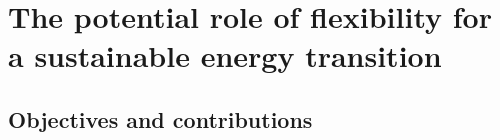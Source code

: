 \chapter{The potential role of flexibility for a sustainable energy transition}
\label{The potential role of flexibility for a sustainable energy transition}
\chaptermark{}

\section{Objectives and contributions} \label{Introduction}

